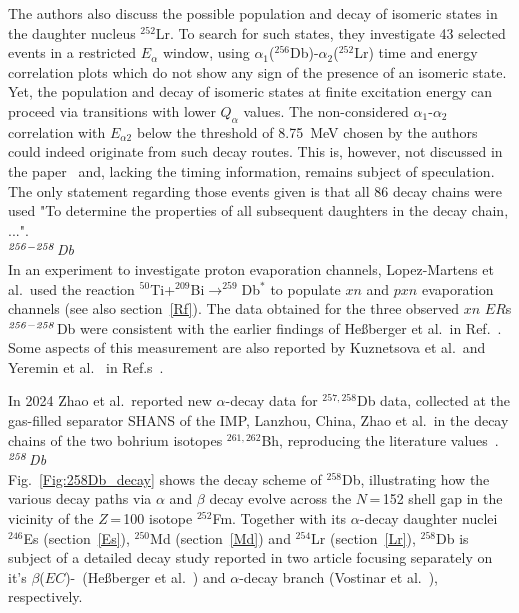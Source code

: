 The authors also discuss the possible population and decay of isomeric states in the daughter nucleus $^{252}$Lr. 
To search for such states, they investigate 43 selected events in a restricted $E_\alpha$ window, using $\alpha_1$($^{256}$Db)-$\alpha_2$($^{252}$Lr) time and energy correlation plots which do not show any sign of the presence of an isomeric state. 
Yet, the population and decay of isomeric states at finite excitation energy can proceed via transitions with lower $Q_\alpha$ values. 
The non-considered $\alpha_1$-$\alpha_2$ correlation with $E_{\alpha2}$ below the threshold of 8.75~MeV chosen by the authors could indeed originate from such decay routes.
This is, however, not discussed in the paper~\cite{Pore2024} and, lacking the timing information, remains subject of speculation.
The only statement regarding those events given is that all 86 decay chains were used "To determine the properties of all subsequent daughters in the decay chain, ...".\\



{\it $^{\it256-258}$Db}\\
In an experiment to investigate proton evaporation channels, Lopez-Martens et al.~used the reaction $^{50}$Ti+$^{209}$Bi$\rightarrow^{259}$Db$^*$ to populate $xn$ and $pxn$ evaporation channels (see also section~\ref{Rf}). The data obtained for the three observed $xn$ $ER$s $^{\it256-258}$Db were consistent with the earlier findings of He{\ss}berger et al.~in Ref.~\cite{Hessberger2001}. Some aspects of this measurement are also reported by Kuznetsova et al.~and Yeremin et al.~ in Ref.s~\cite{Kuznetsova2020,Yeremin2019}.

In 2024 Zhao et al.~reported new $\alpha$-decay data for $^{257,258}$Db data, collected at the gas-filled separator SHANS of the IMP, Lanzhou, China, Zhao et al.~in the decay chains of the two bohrium isotopes $^{261,262}$Bh, reproducing the literature values~\cite{ZhaoZ2024}.\\


{\it $^{\it258}$Db}\\
Fig.~\ref{Fig:258Db_decay} shows the decay scheme of $^{258}$Db, illustrating how the various decay paths via $\alpha$ and $\beta$ decay evolve across the $N$\,=\,152 shell gap in the vicinity of the $Z$\,=\,100 isotope $^{252}$Fm. 
Together with its $\alpha$-decay daughter nuclei $^{246}$Es (section~\ref{Es}), $^{250}$Md (section~\ref{Md}) and $^{254}$Lr (section~\ref{Lr}), $^{258}$Db is subject of a detailed decay study reported in two article focusing separately on it's $\beta$($EC$)-~(He{\ss}berger et al.~\cite{Hessberger2016a}) and $\alpha$-decay branch (Vostinar et al.~\cite{Vostinar2019}), respectively. 

